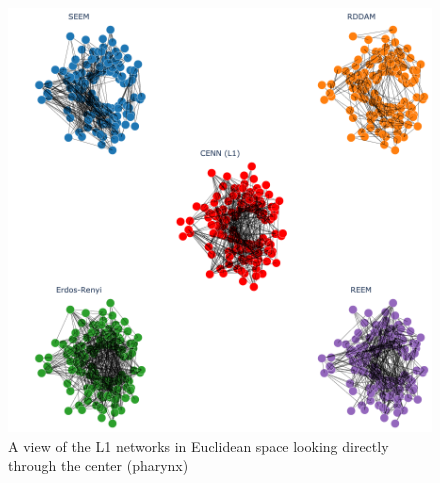 \begin{figure}[ht]
  \centering
  \includegraphics[width=\linewidth]{../data/images/3D/all1_middle.png}
  \caption{A view of the L1 networks in Euclidean space looking directly through the center (pharynx) }
\end{figure}